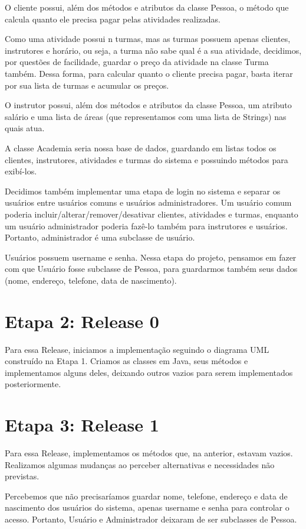 \documentclass[11pt,twoside]{article}
\begin{document}
O cliente possui, além dos métodos e atributos da classe Pessoa, o método que calcula quanto ele precisa pagar pelas atividades
realizadas.

Como uma atividade possui n turmas, mas as turmas possuem apenas clientes, instrutores e horário, ou seja, a turma não sabe
qual é a sua atividade, decidimos, por questões de facilidade, guardar o preço da atividade na classe Turma também. Dessa forma,
para calcular quanto o cliente precisa pagar, basta iterar por sua lista de turmas e acumular os preços.

O instrutor possui, além dos métodos e atributos da classe Pessoa, um atributo salário e uma lista de áreas
(que representamos com uma lista de Strings) nas quais atua.

A classe Academia seria nossa base de dados, guardando em listas todos os clientes, instrutores, atividades e turmas do sistema
e possuindo métodos para exibí-los.

Decidimos também implementar uma etapa de login no sistema e separar os usuários entre usuários comuns e usuários administradores.
Um usuário comum poderia incluir/alterar/remover/desativar clientes, atividades e turmas, enquanto um usuário administrador
poderia fazê-lo também para instrutores e usuários. Portanto, administrador é uma subclasse de usuário.

Usuários possuem username e senha. Nessa etapa do projeto, pensamos em fazer com que Usuário fosse subclasse de Pessoa, para
guardarmos também seus dados (nome, endereço, telefone, data de nascimento).

\section{Etapa 2: Release 0}
Para essa Release, iniciamos a implementação seguindo o diagrama UML construído na Etapa 1. Criamos as classes em Java, seus métodos
e implementamos alguns deles, deixando outros vazios para serem implementados posteriormente.

\section{Etapa 3: Release 1}
Para essa Release, implementamos os métodos que, na anterior, estavam vazios. Realizamos algumas mudanças ao perceber alternativas
e necessidades não previstas.

Percebemos que não precisaríamos guardar nome, telefone, endereço e data de nascimento dos usuários do sistema, apenas username e
senha para controlar o acesso. Portanto, Usuário e Administrador deixaram de ser subclasses de Pessoa.
\end{document}
